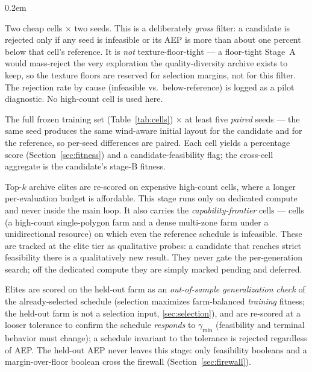 \documentclass[11pt]{article}
\newcommand{\gm}{\gamma_{\min}}
\begin{document}
\begin{description}
\itemsep0.2em
\item[Stage A (gross fast-reject).] Two cheap cells $\times$ two seeds. This is a
deliberately \emph{gross} filter: a candidate is rejected only if any seed is
infeasible or its AEP is more than about one percent below that cell's reference. It is
\emph{not} texture-floor-tight --- a floor-tight Stage~A would mass-reject the very
exploration the quality-diversity archive exists to keep, so the texture floors are
reserved for selection margins, not for this filter. The rejection rate by cause
(infeasible vs.\ below-reference) is logged as a pilot diagnostic. No high-count cell is
used here.
\item[Stage B (training matrix).] The full frozen training set (Table~\ref{tab:cells})
$\times$ at least five \emph{paired} seeds --- the same seed produces the same
wind-aware initial layout for the candidate and for the reference, so per-seed
differences are paired. Each cell yields a percentage score (Section~\ref{sec:fitness})
and a candidate-feasibility flag; the cross-cell aggregate is the candidate's stage-B
fitness.
\item[Stage B$^{+}$ (elite tier).] Top-$k$ archive elites are re-scored on expensive
high-count cells, where a longer per-evaluation budget is affordable. This stage runs
only on dedicated compute and never inside the main loop. It also carries the
\emph{capability-frontier} cells --- cells (a high-count single-polygon farm and a
dense multi-zone farm under a unidirectional resource) on which even the reference
schedule is infeasible. These are tracked at the elite tier as qualitative probes: a
candidate that reaches strict feasibility there is a qualitatively new result. They
never gate the per-generation search; off the dedicated compute they are simply marked
pending and deferred.
\item[Stage C (holdout \& responsiveness).] Elites are scored on the held-out farm as an
\emph{out-of-sample generalization check} of the already-selected schedule (selection
maximizes farm-balanced \emph{training} fitness; the held-out farm is not a selection
input, \cref{sec:selection}), and are re-scored at a looser tolerance to confirm the
schedule \emph{responds} to $\gm$ (feasibility and terminal behavior must change); a
schedule invariant to the tolerance is rejected regardless of AEP. The held-out AEP never
leaves this stage: only feasibility booleans and a margin-over-floor boolean cross the
firewall (Section~\ref{sec:firewall}).
\end{description}
\end{document}
